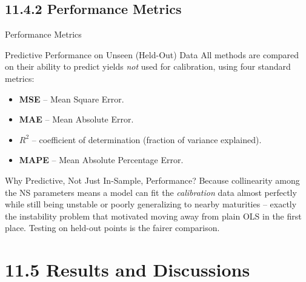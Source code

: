 \documentclass[aspectratio=169,10pt]{beamer}
\begin{document}
\subsection{11.4.2 Performance Metrics}

\begin{frame}{Performance Metrics}

\begin{block}{Predictive Performance on Unseen (Held-Out) Data}
  All methods are compared on their ability to predict yields \emph{not}
  used for calibration, using four standard metrics:
  \begin{itemize}
    \item \textbf{MSE} -- Mean Square Error.
    \item \textbf{MAE} -- Mean Absolute Error.
    \item \textbf{$R^2$} -- coefficient of determination (fraction of
      variance explained).
    \item \textbf{MAPE} -- Mean Absolute Percentage Error.
  \end{itemize}
\end{block}

\begin{exampleblock}{Why Predictive, Not Just In-Sample, Performance?}
  Because collinearity among the NS parameters means a model can fit the
  \emph{calibration} data almost perfectly while still being unstable or
  poorly generalizing to nearby maturities -- exactly the instability
  problem that motivated moving away from plain OLS in the first place.
  Testing on held-out points is the fairer comparison.
\end{exampleblock}

\end{frame}

\section{11.5 Results and Discussions}
\end{document}

